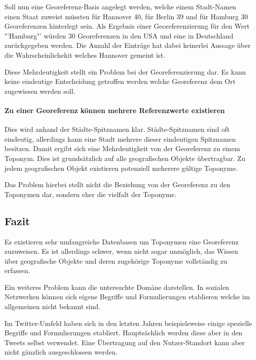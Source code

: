 					Soll nun eine Georeferenz-Basis angelegt werden, welche einem Stadt-Namen einen Staat zuweist müssten für Hannover 40, für Berlin 39 und für Hamburg 30 Georeferenzen hinterlegt sein.
					Als Ergebnis einer Georeferenzierung für den Wert "'Hamburg"' würden 30 Georeferenzen in den USA und eine in Deutschland zurückgegeben werden. 
					Die Anzahl der Einträge hat dabei keinerlei Aussage über die Wahrscheinlichekit welches Hannover gemeint ist.

					Diese Mehrdeutigkeit stellt ein Problem bei der Georeferenzierung dar.
					Es kann keine eindeutige Entscheidung getroffen werden welche Georeferenz dem Ort zugewiesen werden soll. 

				\paragraph{Zu einer Georeferenz können mehrere Referenzwerte existieren}

					Dies wird anhand der Städte-Spitznamen klar. 
					Städte-Spitznamen sind oft eindeutig, allerdings kann eine Stadt mehrere dieser eindeutigen Spitznamen besitzen. 
					Damit ergibt sich eine Mehrdeutigkeit von der Georeferenz zu einem Toponym.
					Dies ist grundsätzlich auf alle geografischen Objekte übertragbar.
					Zu jedem geografischen Objekt existieren potenziell meherere gültige Toponyme.

					Das Problem hierbei stellt nicht die Beziehung von der Georeferenz zu den Toponymen dar, sondern eher die vielfalt der Toponyme. 

		\subsection{Fazit}

			Es existieren sehr umfangreiche Datenbasen um Toponymen eine Georeferenz zuzuweisen. 
			Es ist allerdings schwer, wenn nicht sogar unmöglich, das Wissen über geografische Objekte und deren zugehörige Toponyme vollständig zu erfassen.
			
			Ein weiteres Problem kann die untersuchte Domäne darstellen. 
			In sozialen Netzwerken können sich eigene Begriffe und Formulierungen etablieren welche im allgemeinen nicht bekannt sind.

			Im Twitter-Umfeld haben sich in den letzten Jahren beispielsweise einige spezielle Begriffe und Formulierungen etabliert.
			Hauptsächlich werden diese aber in den Tweets selbst verwendet. 
			Eine Übertragung auf den Nutzer-Standort kann aber nicht gänzlich ausgeschlossen werden. 

